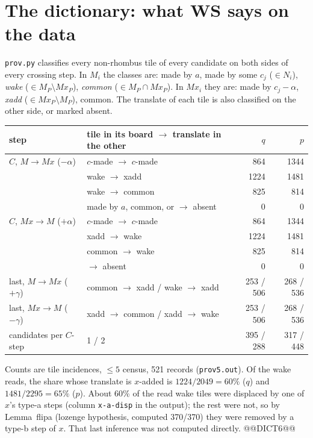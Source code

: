 \section{The dictionary: what WS says on the data}\label{sec:dict}
\texttt{prov.py} classifies every non-rhombus tile of every candidate on both sides of every crossing step. In $M_i$ the classes are: made by $a$, made by some $c_j$ ($\in N_i$), \emph{wake} ($\in M_P\setminus Mx_P$), \emph{common} ($\in M_P\cap Mx_P$).
In $Mx_i$ they are: made by $c_j-\alpha$, \emph{xadd} ($\in Mx_P\setminus M_P$), common. The translate of each tile is also classified on the other side, or marked absent.
\begin{center}\begin{tabular}{llrr}\toprule
step & tile in its board $\to$ translate in the other & $q$ & $p$\\\midrule
$C$, $M\to Mx$ ($-\alpha$) & $c$-made $\to$ $c$-made & 864 & 1344\\
& wake $\to$ xadd & 1224 & 1481\\
& wake $\to$ common & 825 & 814\\
& made by $a$, common, or $\to$ absent & 0 & 0\\
$C$, $Mx\to M$ ($+\alpha$) & $c$-made $\to$ $c$-made & 864 & 1344\\
& xadd $\to$ wake & 1224 & 1481\\
& common $\to$ wake & 825 & 814\\
& $\to$ absent & 0 & 0\\
last, $M\to Mx$ ($+\gamma$) & common $\to$ xadd / wake $\to$ xadd & 253 / 506 & 268 / 536\\
last, $Mx\to M$ ($-\gamma$) & xadd $\to$ common / xadd $\to$ wake & 253 / 506 & 268 / 536\\\midrule
candidates per $C$-step & 1 / 2 & 395 / 288 & 317 / 448\\\bottomrule
\end{tabular}\end{center}
Counts are tile incidences, $\le5$ census, 521 records (\texttt{prov5.out}). Of the wake reads, the share whose translate is $x$-added is $1224/2049=60\%$ ($q$) and $1481/2295=65\%$ ($p$).
About 60\% of the read wake tiles were displaced by one of $x$'s type-a steps (column \texttt{x-a-disp} in the output); the rest were not, so by Lemma~flipa (lozenge hypothesis, computed 370/370) they were removed by a type-b step of $x$. That last inference was not computed directly.
@@DICT6@@


